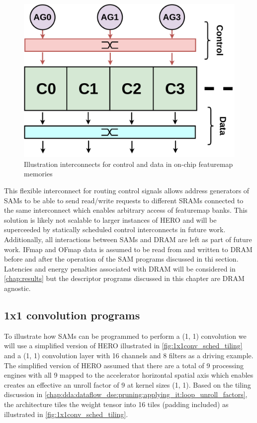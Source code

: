 \begin{figure}[ht]
    \centering
    \includegraphics[scale=0.3]{fig/interconnect.pdf}
    \caption{Illustration interconnects for control and data in on-chip featuremap memories}
    \label{fig:interconnect}
\end{figure}


This flexible interconnect for routing control signals
allows address generators of SAMs to be able to send read/write requests to
different SRAMs connected to the same interconnect which enables arbitrary
access of featuremap banks. This solution is likely not scalable to larger
instances of HERO and will be superceeded by statically scheduled control
interconnects in future work. 
Additionally, all interactions between SAMs and DRAM are left as part of future
work. IFmap and OFmap data is assumed to be read from and written to DRAM before
and after the operation of the SAM programs discussed in thi section. Latencies
and energy penalties associated with DRAM will be considered in
\autoref{chap:results} but the descriptor programs discussed in this chapter are
DRAM agnostic.

\subsection{1x1 convolution programs}
\label{chap:sams:acc_scheduling:1x1}


To illustrate how SAMs can be programmed to perform a (1, 1) convolution we will
use a simplified version of HERO illustrated in \autoref{fig:1x1conv_sched_tiling} and a (1, 1) convolution
layer with 16 channels and 8 filters as a driving example. The simplified
version of HERO assumed that there are a total of 9 processing engines with all 9
mapped to the accelerator horizontal spatial axis which enables creates an
effective an unroll factor of 9 at kernel sizes (1, 1). Based on the tiling
discussion in
\autoref{chap:dda:dataflow_dse:pruning:applying_it:loop_unroll_factors}, the
architecture tiles the weight tensor into 16 tiles (padding included) as
illustrated in \autoref{fig:1x1conv_sched_tiling}.

